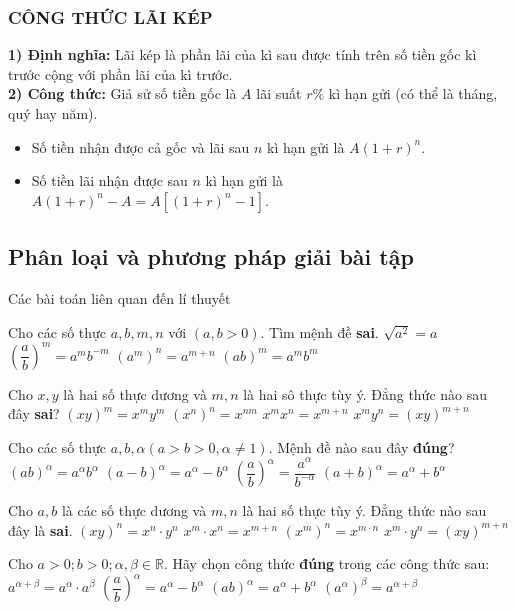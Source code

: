 \subsubsection{CÔNG THỨC LÃI KÉP}
\textbf{1) Định nghĩa:} Lãi kép là phần lãi của kì sau được tính trên số tiền gốc kì trước cộng với phần lãi của kì trước.\\
\textbf{2) Công thức:} Giả sử số tiền gốc là $A$ lãi suất $r\%$ kì hạn gửi (có thể là tháng, quý hay năm).
\begin{itemize}
	\item Số tiền nhận được cả gốc và lãi sau $n$ kì hạn gửi là $A(1+r)^n$.
	\item Số tiền lãi nhận được sau $n$ kì hạn gửi là $A(1+r)^n-A=A\left[(1+r)^n-1\right]$.
\end{itemize}
\subsection{Phân loại và phương pháp giải bài tập}
\begin{dang}{Các bài toán liên quan đến lí thuyết}
\end{dang}
\begin{ex}%
	Cho các số thực $a,b,m,n$ với $(a,b>0)$. Tìm mệnh đề \textbf{sai}. 
	\choice
	{$\sqrt{a^2}=a$}
	{$\left(\dfrac{a}{b}\right)^m=a^mb^{-m}$}
	{\True $(a^m)^n=a^{m+n}$}
	{$(ab)^m=a^mb^m$}
\end{ex}
\begin{ex}%
	Cho $x,y$ là hai số thực dương và $m,n$ là hai sô thực tùy ý. Đẳng thức nào sau đây \textbf{sai}?
	\choice
	{$(xy)^m=x^my^m$}
	{$(x^n)^n=x^{nm}$}
	{$x^mx^n=x^{m+n}$}
	{\True $x^my^n=(xy)^{m+n}$}
\end{ex}
\begin{ex}%
	Cho các số thực $a,b,\alpha (a>b>0,\alpha\neq 1)$. Mệnh đề nào sau đây \textbf{đúng}?
	\choice
	{\True $(ab)^{\alpha}=a^{\alpha}b^{\alpha}$}
	{$(a-b)^{\alpha}=a^{\alpha}-b^{\alpha}$}
	{$\left(\dfrac{a}{b}\right)^{\alpha}=\dfrac{a^{\alpha}}{b^{-\alpha}}$}
	{$(a+b)^{\alpha}=a^{\alpha}+b^{\alpha}$}
\end{ex}
\begin{ex}%
	Cho $a, b$ là các số thực dương và $m, n$ là hai số thực tùy ý. Đẳng thức nào sau đây là \textbf{sai}. 
	\choice
	{$(xy)^n=x^n\cdot y^n$}
	{$x^m\cdot x^n=x^{m+n}$}
	{$(x^m)^n=x^{m\cdot n}$}
	{\True $x^m\cdot y^n=(xy)^{m+n}$}
\end{ex}
\begin{ex}%
	Cho $a>0;b>0;\alpha,\beta\in\mathbb{R}$. Hãy chọn công thức \textbf{đúng} trong các công thức sau: 
	\choice
	{\True $a^{\alpha+\beta}=a^{\alpha}\cdot a^{\beta}$}
	{$\left(\dfrac{a}{b}\right)^{\alpha}=a^{\alpha}-b^{\alpha}$}
	{$(ab)^{\alpha}=a^{\alpha}+b^{\alpha}$}
	{$\left(a^{\alpha}\right)^{\beta}=a^{\alpha+\beta}$}
\end{ex}

